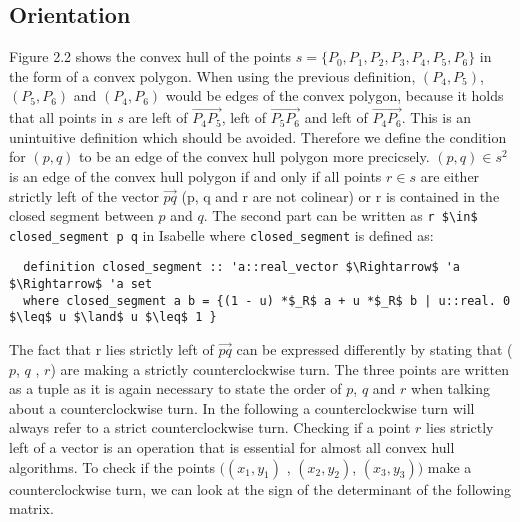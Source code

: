\subsection{Orientation}
Figure 2.2 shows the convex hull of the points $s = \{P_0, P_1, P_2 , P_3 ,P_4, P_5 , P_6 \}$ in the form of a convex polygon.
When using the previous definition, $(P_4,P_5)$, $(P_5,P_6)$ and $(P_4,P_6)$
would be edges of the convex polygon, because it holds that all points in $s$ are left 
of $\vec{P_4 P_5}$, left of $\vec{P_5 P_6}$ and left of $\vec{P_4 P_6}$. 
This is an unintuitive definition which should be avoided. Therefore we define the 
condition for $(p,q)$ to be an edge of the convex hull polygon more precicsely.
$(p,q) \in s^2$ is an edge of the convex hull polygon if and only if all points $r \in s$ 
are either strictly left of the vector $\vec{p q}$ (p, q and r are not colinear) or 
r is contained in the closed segment between $p$ and $q$. The second part can be written
as \lstinline|r $\in$ closed_segment p q| in Isabelle where \lstinline|closed_segment| is
defined as:
\begin{lstlisting}
  definition closed_segment :: 'a::real_vector $\Rightarrow$ 'a $\Rightarrow$ 'a set
  where closed_segment a b = {(1 - u) *$_R$ a + u *$_R$ b | u::real. 0 $\leq$ u $\land$ u $\leq$ 1 }
\end{lstlisting}
The fact that r lies strictly left 
of $\vec{p q}$ can be expressed differently by stating that ($p$, $q$ , $r$) 
are making a strictly counterclockwise turn. The three points are written as 
a tuple as it is again necessary to state the order of 
$p$, $q$ and $r$ when talking about a counterclockwise turn. In the following a counterclockwise turn will always refer to a strict 
counterclockwise turn. Checking if a point $r$ lies
strictly left of a vector is an operation that is essential for almost all
convex hull algorithms. To check if the points $((x_1,y_1)$ , $(x_2,y_2)$, $(x_3,y_3))$
make a counterclockwise turn, we can look at the sign of the determinant of the 
following matrix.

